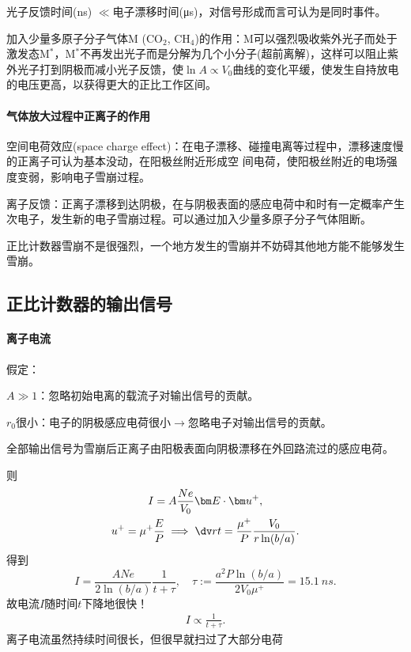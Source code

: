 \begin{compactitem}
	\item 光子反馈时间(\si{ns}) $\ll$电子漂移时间(\si{\micro s})，对信号形成而言可认为是同时事件。
	\item 加入少量多原子分子气体M (CO$_2$, CH$_4$)的作用：M可以强烈吸收紫外光子而处于激发态M$^*$，M$^\ast$不再发出光子而是分解为几个小分子(超前离解)，这样可以阻止紫外光子打到阴极而减小光子反馈，使$\ln A\propto V_0$曲线的变化平缓，使发生自持放电的电压更高，以获得更大的正比工作区间。
\end{compactitem}
\paragraph{气体放大过程中正离子的作用}
空间电荷效应(space charge effect)：在电子漂移、碰撞电离等过程中，漂移速度慢的正离子可认为基本没动，在阳极丝附近形成空
间电荷，使阳极丝附近的电场强度变弱，影响电子雪崩过程。%

离子反馈：正离子漂移到达阴极，在与阴极表面的感应电荷中和时有一定概率产生次电子，发生新的电子雪崩过程。可以通过加入少量多原子分子气体阻断。

正比计数器雪崩不是很强烈，一个地方发生的雪崩并不妨碍其他地方能不能够发生雪崩。

\subsection{正比计数器的输出信号}

\paragraph{离子电流}假定：
\begin{compactenum}
	\item $A\gg 1$：忽略初始电离的载流子对输出信号的贡献。
	\item $r_0$很小：电子的阴极感应电荷很小$\to$忽略电子对输出信号的贡献。
	\item 全部输出信号为雪崩后正离子由阳极表面向阴极漂移在外回路流过的感应电荷。
\end{compactenum}
则
\begin{gather*}
	I=A\frac{Ne}{V_0}\bm E\cdot\bm u^+,\\
	u^+=\mu^+\frac EP\implies\dv rt=\frac{\mu^+}P\frac{V_0}{r\ln(b/a)}.
\end{gather*}
得到
\[
	I=\frac{ANe}{2\ln(b/a)}\frac1{t+\tau},\quad\tau:=\frac{a^2P\ln(b/a)}{2V_0\mu^+}=\SI{15.1}{ns}.
\]
故电流$I$随时间$t$下降地很快！
\begin{align}
	I\propto\frac1{t+\tau}.
\end{align}
离子电流虽然持续时间很长，但很早就扫过了大部分电荷

